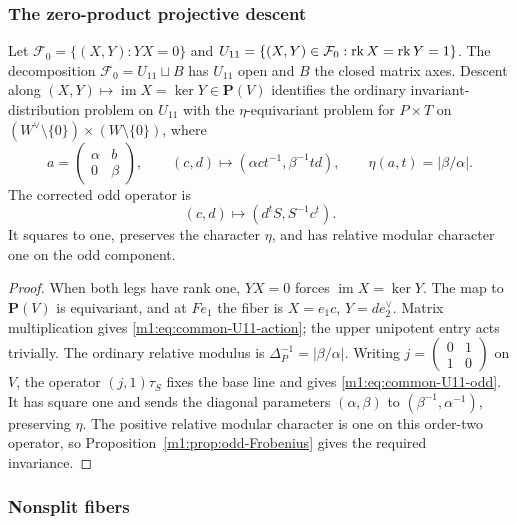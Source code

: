 \subsubsection{The zero-product projective descent}\label{m1:subsec:zero-product-descent}
\begin{lemma}\label{m1:lem:common-U11}
Let $\mathcal F_0=\{(X,Y):YX=0\}$ and
$U_{11}=\{(X,Y)\in\mathcal F_0:\operatorname{rk} X=\operatorname{rk} Y=1\}$.
The decomposition $\mathcal F_0=U_{11}\sqcup B$ has $U_{11}$ open and
$B$ the closed matrix axes. Descent along
$(X,Y)\mapsto\operatorname{im}X=\ker Y\in\mathbf P(V)$ identifies the
ordinary invariant-distribution problem on $U_{11}$ with the
$\eta$-equivariant problem for $P\times T$ on
$(W^\vee\setminus\{0\})\times(W\setminus\{0\})$, where
\begin{equation}\label{m1:eq:common-U11-action}
 a=\begin{pmatrix}\alpha&b\\0&\beta\end{pmatrix},\qquad
 (c,d)\longmapsto(\alpha ct^{-1},\beta^{-1}td),\qquad
 \eta(a,t)=|\beta/\alpha|.
\end{equation}
The corrected odd operator is
\begin{equation}\label{m1:eq:common-U11-odd}
 (c,d)\longmapsto(d^tS,S^{-1}c^t).
\end{equation}
It squares to one, preserves the character $\eta$, and has relative
modular character one on the odd component.
\end{lemma}
\begin{proof}
When both legs have rank one, $YX=0$ forces $\operatorname{im}X=\ker Y$.
The map to $\mathbf P(V)$ is equivariant, and at $Fe_1$ the fiber
is $X=e_1c$, $Y=de_2^\vee$. Matrix multiplication gives
\eqref{m1:eq:common-U11-action}; the upper unipotent entry acts trivially.
The ordinary relative modulus is $\Delta_P^{-1}=|\beta/\alpha|$.
Writing $j=\left(\begin{smallmatrix}0&1\\1&0\end{smallmatrix}\right)$
on $V$, the operator $(j,1)\tau_S$ fixes the base line and gives
\eqref{m1:eq:common-U11-odd}. It has square one and sends the diagonal
parameters $(\alpha,\beta)$ to $(\beta^{-1},\alpha^{-1})$, preserving
$\eta$. The positive relative modular character is one on this
order-two operator, so Proposition~\ref{m1:prop:odd-Frobenius} gives the required invariance.
\end{proof}

\subsubsection{Nonsplit fibers}\label{m1:subsec:two-leg-nonsplit}

